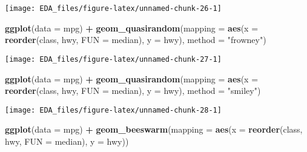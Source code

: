 \documentclass[]{book}
\newenvironment{Shaded}{\begin{snugshade}}{\end{snugshade}}
\newcommand{\DataTypeTok}[1]{\textcolor[rgb]{0.13,0.29,0.53}{#1}}
\newcommand{\KeywordTok}[1]{\textcolor[rgb]{0.13,0.29,0.53}{\textbf{#1}}}
\newcommand{\NormalTok}[1]{#1}
\newcommand{\OperatorTok}[1]{\textcolor[rgb]{0.81,0.36,0.00}{\textbf{#1}}}
\newcommand{\StringTok}[1]{\textcolor[rgb]{0.31,0.60,0.02}{#1}}
\theoremstyle{definition}
\theoremstyle{definition}
\theoremstyle{definition}
\theoremstyle{remark}
\begin{document}
\begin{center}\texttt{[image: EDA\_files/figure-latex/unnamed-chunk-26-1]} \end{center}

\begin{Shaded}
\begin{Highlighting}[]
\KeywordTok{ggplot}\NormalTok{(}\DataTypeTok{data =}\NormalTok{ mpg) }\OperatorTok{+}
\StringTok{  }\KeywordTok{geom_quasirandom}\NormalTok{(}\DataTypeTok{mapping =} \KeywordTok{aes}\NormalTok{(}\DataTypeTok{x =} \KeywordTok{reorder}\NormalTok{(class, hwy, }\DataTypeTok{FUN =}\NormalTok{ median),}
                                 \DataTypeTok{y =}\NormalTok{ hwy),}
                   \DataTypeTok{method =} \StringTok{"frowney"}\NormalTok{)}
\end{Highlighting}
\end{Shaded}

\begin{center}\texttt{[image: EDA\_files/figure-latex/unnamed-chunk-27-1]} \end{center}

\begin{Shaded}
\begin{Highlighting}[]
\KeywordTok{ggplot}\NormalTok{(}\DataTypeTok{data =}\NormalTok{ mpg) }\OperatorTok{+}
\StringTok{  }\KeywordTok{geom_quasirandom}\NormalTok{(}\DataTypeTok{mapping =} \KeywordTok{aes}\NormalTok{(}\DataTypeTok{x =} \KeywordTok{reorder}\NormalTok{(class, hwy, }\DataTypeTok{FUN =}\NormalTok{ median),}
                                 \DataTypeTok{y =}\NormalTok{ hwy),}
                   \DataTypeTok{method =} \StringTok{"smiley"}\NormalTok{)}
\end{Highlighting}
\end{Shaded}

\begin{center}\texttt{[image: EDA\_files/figure-latex/unnamed-chunk-28-1]} \end{center}

\begin{Shaded}
\begin{Highlighting}[]
\KeywordTok{ggplot}\NormalTok{(}\DataTypeTok{data =}\NormalTok{ mpg) }\OperatorTok{+}
\StringTok{  }\KeywordTok{geom_beeswarm}\NormalTok{(}\DataTypeTok{mapping =} \KeywordTok{aes}\NormalTok{(}\DataTypeTok{x =} \KeywordTok{reorder}\NormalTok{(class, hwy, }\DataTypeTok{FUN =}\NormalTok{ median),}
                                 \DataTypeTok{y =}\NormalTok{ hwy))}
\end{Highlighting}
\end{Shaded}
\end{document}

